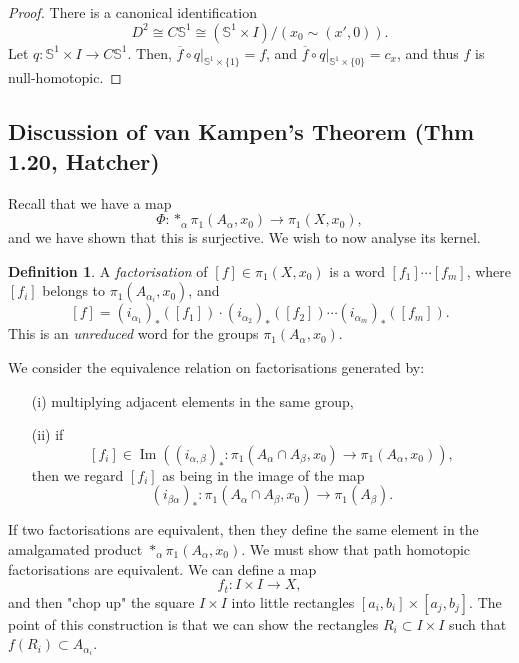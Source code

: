 \documentclass[a4paper]{report}
\theoremstyle{definition}
\newtheorem{definition}{Definition}
\theoremstyle{remark}
\theoremstyle{proposition}
\theoremstyle{conjecture}
\theoremstyle{lemma}
\theoremstyle{corollary}
\theoremstyle{exercise}
\newcommand{\on}{\operatorname}
\begin{document}
\begin{proof}
    There is a canonical identification 
    $$D^2 \cong C\mathbb{S}^1 \cong (\mathbb{S}^1 \times I)/(x_0 \sim (x',0)).$$
    Let $q : \mathbb{S}^1 \times I \to C\mathbb{S}^1$.
    Then, $\overline{f} \circ q \vert_{\mathbb{S}^1 \times \lbrace 1\rbrace} = f$,
    and $\overline{f}\circ q \vert_{\mathbb{S}^1 \times \lbrace 0 \rbrace} = c_x$,
    and thus $f$ is null-homotopic.
\end{proof}

\subsection{Discussion of van Kampen's Theorem (Thm 1.20, Hatcher)}

Recall that we have a map 
$$\Phi : \ast_\alpha \pi_1(A_\alpha, x_0) \longrightarrow \pi_1(X,x_0),$$
and we have shown that this is surjective. We wish to now analyse its kernel.

\begin{definition}
    A \emph{factorisation} of $[f] \in \pi_1(X,x_0)$ is a word 
    $[f_1] \cdots [f_m]$, where $[f_i]$ belongs to $\pi_1(A_{\alpha_i},x_0)$,
    and $$[f] = (i_{\alpha_1})_\ast([f_1])\cdot  (i_{\alpha_2})_\ast([f_2]) \cdots (i_{\alpha_m})_\ast ([f_m]).$$
    This is an \emph{unreduced} word for the groups 
    $\pi_1(A_\alpha,x_0)$.
\end{definition}
We consider the equivalence relation on factorisations 
generated by: \begin{itemize}
    \item[(i)] multiplying adjacent elements in the same group,
    \item[(ii)] if $$[f_i] \in \on{Im}((i_{\alpha,\beta})_\ast : \pi_1(A_\alpha \cap A_\beta, x_0) \to \pi_1(A_\alpha,x_0)),$$
    then we regard $[f_i]$ as being in the image of the map $$(i_{\beta\alpha})_\ast : \pi_1(A_\alpha \cap A_\beta, x_0) \longrightarrow \pi_1(A_\beta).$$
\end{itemize}
If two factorisations are equivalent, then they define the same element in the amalgamated product 
$\ast_\alpha \pi_1(A_\alpha,x_0)$.
We must show that path homotopic factorisations are equivalent.
We can define a map $$f_t : I \times I \longrightarrow X,$$
and then "chop up" the square $I\times I$ into little rectangles $[a_i,b_i] \times [a_j,b_j]$.
The point of this construction is that we can show the rectangles $R_i \subset I \times I$ 
such that $f(R_i) \subset A_{\alpha_i}$.
\end{document}
